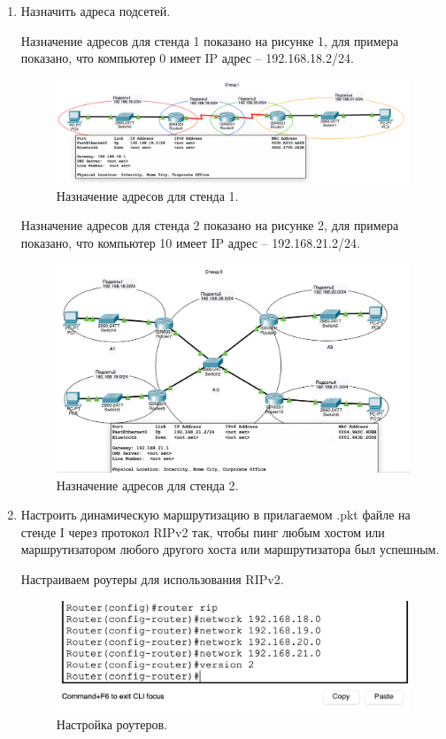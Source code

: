 \documentclass[a4paper,14pt]{extreport} %
\begin{document}
\begin{enumerate}

\item Назначить адреса подсетей.

Назначение адресов для стенда 1 показано на рисунке 1, для примера показано, что компьютер 0 имеет IP адрес -- 192.168.18.2/24.

\begin{figure}[H]
  \centering
  \includegraphics[scale=0.56]{1}
  \caption{Назначение адресов для стенда 1. }
\end{figure}

Назначение адресов для стенда 2 показано на рисунке 2, для примера показано, что компьютер 10 имеет IP адрес -- 192.168.21.2/24.

\begin{figure}[H]
  \centering
  \includegraphics[scale=0.6]{2}
  \caption{Назначение адресов для стенда 2. }
\end{figure}

\item Настроить динамическую маршрутизацию в прилагаемом .pkt файле на стенде I через протокол RIPv2 так, чтобы пинг любым хостом или маршрутизатором любого другого хоста или маршрутизатора был успешным.

Настраиваем роутеры для использования RIPv2. 
 
\begin{figure}[H]
  \centering
  \includegraphics[scale=0.8]{3}
  \caption{Настройка роутеров. }
\end{figure}


\end{enumerate}
\end{document}
